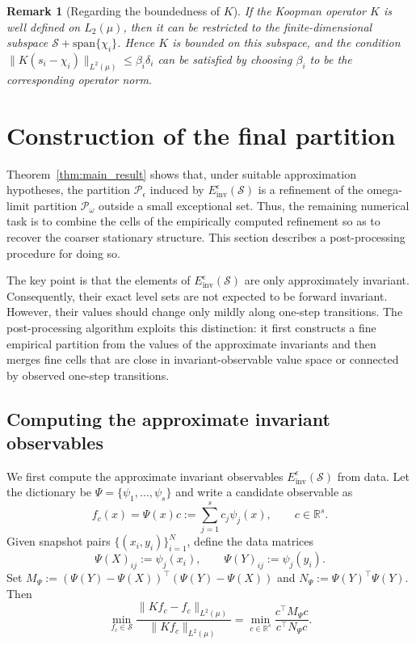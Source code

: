 \documentclass[letterpaper, 10 pt, conference]{ieeeconf}
\newcommand{\real}{\mathbb{R}}
\newcommand{\Pc}{\mathcal{P}}
\newcommand{\Sc}{\mathcal{S}}
\newtheorem{remark}[theorem]{Remark}
\newcommand{\R}{\mathbb{R}}
\begin{document}
\begin{remark}[Regarding the boundedness of $K$]
If the Koopman operator $K$ is well defined on $L_2(\mu)$, then it can be restricted to the finite-dimensional subspace $\Sc + \text{span}\{\chi_i\}$. Hence $K$ is bounded on this subspace, and the condition $\|{K(s_i-\chi_i)}\|_{L^2(\mu)} \leq \beta_i\delta_i$ can be satisfied by choosing $\beta_i$ to be the corresponding operator norm.
\end{remark}

\section{Construction of the final partition}
\label{sec:post_processing_partition}

Theorem~\ref{thm:main_result} shows that, under suitable approximation hypotheses, the partition $\Pc_\epsilon$ induced by $E_{\text{inv}}^\epsilon(\Sc)$ is a refinement of the omega-limit partition $\Pc_{\omega}$ outside a small exceptional set. Thus, the remaining numerical task is to combine the cells of the empirically computed refinement so as to recover the coarser stationary structure. This section describes a post-processing procedure for doing so.

The key point is that the elements of $E_{\text{inv}}^\epsilon(\Sc)$ are only approximately invariant. Consequently, their exact level sets are not expected to be forward invariant. However, their values should change only mildly along one-step transitions. The post-processing algorithm exploits this distinction: it first constructs a fine empirical partition from the values of the approximate invariants and then merges fine cells that are close in invariant-observable value space or connected by observed one-step transitions.


\subsection{Computing the approximate invariant observables}
We first compute the approximate invariant observables $E_{\text{inv}}^\epsilon(\Sc)$ from data. Let the dictionary be $\Psi=\{\psi_1,\ldots,\psi_s\}$ and write a candidate observable as
\begin{equation}
    f_c(x)=\Psi(x)c:=\sum_{j=1}^s c_j\psi_j(x),
    \qquad c\in\R^s.
\end{equation}
Given snapshot pairs $\{(x_i,y_i)\}_{i=1}^N$, define the data matrices
\begin{equation}
    \Psi(X)_{ij}:=\psi_j(x_i),
    \qquad
    \Psi(Y)_{ij}:=\psi_j(y_i).
\end{equation}
Set $M_\Psi := (\Psi(Y)-\Psi(X))^{\top} (\Psi(Y)-\Psi(X))$ and $N_\Psi := \Psi(Y)^{\top}\Psi(Y)$. Then
\begin{equation}
    \min_{f_c \in \Sc} \frac{\|Kf_c-f_c\|_{L^2(\mu)}}{\|Kf_c\|_{L^2(\mu)}} = 
    \min_{c \in \real^s} \frac{c^{\top}M_\Psi c}{c^{\top}N_\Psi c}.
\end{equation}
\end{document}

